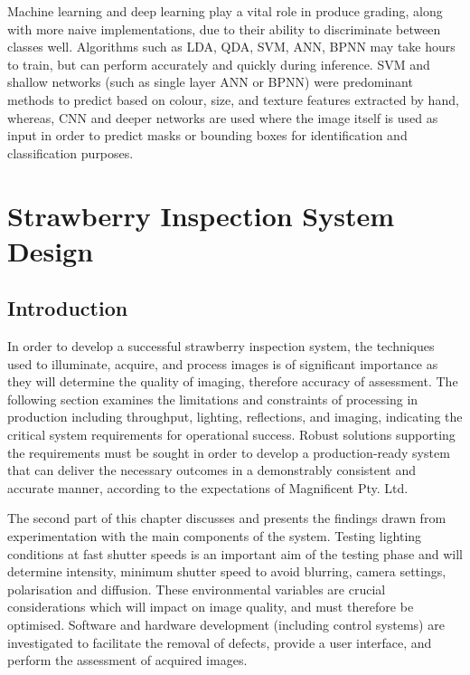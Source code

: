 \documentclass[fleqn,twoside,12pt]{report}
\begin{document}
Machine learning and deep learning play a vital role in produce grading, along with more naive implementations, due to their ability to discriminate between classes well. Algorithms such as LDA, QDA, SVM, ANN, BPNN may take hours to train, but can perform accurately and quickly during inference. SVM and shallow networks (such as single layer ANN or BPNN) were predominant methods to predict based on colour, size, and texture features extracted by hand, whereas, CNN and deeper networks are used where the image itself is used as input in order to predict masks or bounding boxes for identification and classification purposes.



 


\newpage

\chapter{Strawberry Inspection System Design}
\label{sec:I}


\section{Introduction}


In order to develop a successful strawberry inspection system, the techniques used to illuminate, acquire, and process images is of significant importance as they will determine the quality of imaging, therefore accuracy of assessment. The following section examines the limitations and constraints of processing in production including throughput, lighting, reflections, and imaging, indicating the critical system requirements for operational success. Robust solutions supporting the requirements must be sought in order to develop a production-ready system that can deliver the necessary outcomes in a demonstrably consistent and accurate manner, according to the expectations of Magnificent Pty. Ltd.

The second part of this chapter discusses and presents the findings drawn from experimentation with the main components of the system. Testing lighting conditions at fast shutter speeds is an important aim of the testing phase and will determine intensity, minimum shutter speed to avoid blurring, camera settings, polarisation and diffusion. These environmental variables are crucial considerations which will impact on image quality, and must therefore be optimised. Software and hardware development (including control systems) are investigated to facilitate the removal of defects, provide a user interface, and perform the assessment of acquired images.
\end{document}
